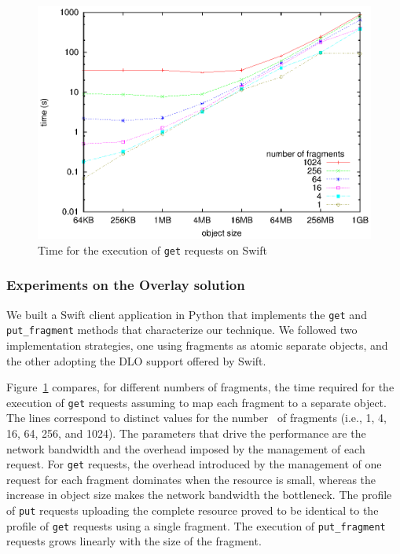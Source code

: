 \begin{figure}[t]
\centering
\includegraphics[width=0.8\columnwidth,valign=t]{figures/fig10}
\caption{\label{ms:fig:getPlain}Time for the execution of {\tt get} requests on Swift}
\end{figure}

\subsubsection{Experiments on the Overlay solution}
We built a Swift client application in Python that implements the {\tt get} and {\tt put\_fragment} methods that characterize our technique. We followed two implementation strategies, one using fragments as atomic separate objects, and the other adopting the DLO support offered by Swift.

Figure~\ref{ms:fig:getPlain} compares, for different numbers of fragments, the time required for the execution of {\tt get} requests assuming to map each fragment to a separate object. The lines correspond to distinct values for the number \fnum\ of fragments (i.e., 1, 4, 16, 64, 256, and 1024). The parameters that drive the performance are the network bandwidth and the overhead imposed by the management of each request. For {\tt get} requests, the overhead introduced by the management of one request for each fragment dominates when the resource is small, whereas the increase in object size makes the network bandwidth the bottleneck. The profile of {\tt put} requests uploading the complete resource proved to be identical to the profile of {\tt get} requests using a single fragment. The execution of {\tt put\_fragment} requests grows linearly with the size of the fragment.

